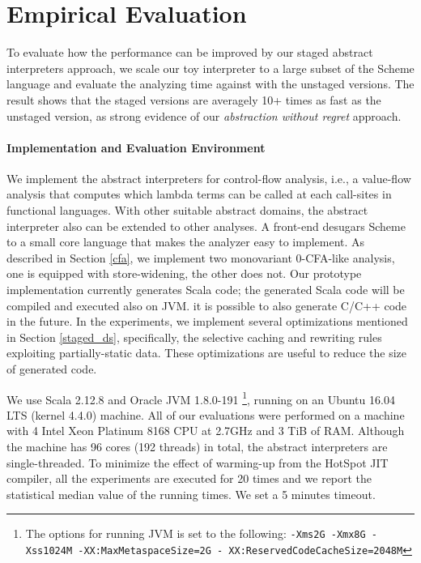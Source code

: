 \section{Empirical Evaluation} \label{evaluation}

To evaluate how the performance can be improved by our staged abstract interpreters
approach, we scale our toy interpreter to a large subset of the Scheme language
and evaluate the analyzing time against with the unstaged versions. The result
shows that the staged versions are averagely 10+ times as fast as the unstaged
version, as strong evidence of our \textit{abstraction without regret}
approach.

\paragraph{Implementation and Evaluation Environment}
We implement the abstract interpreters for control-flow analysis, i.e., a
value-flow analysis that computes which lambda terms can be called at each
call-sites in functional languages. With other suitable abstract domains, the
abstract interpreter also can be extended to other analyses. A front-end
desugars Scheme to a small core language that makes the analyzer easy to
implement. As described in Section \ref{cfa}, we implement two monovariant
0-CFA-like analysis, one is equipped with store-widening, the other does not.
 Our prototype implementation currently generates
Scala code; the generated Scala code will be compiled and executed also on JVM.
it is possible to also generate C/C++ code in the future. In the experiments, we
implement several optimizations mentioned in Section \ref{staged_ds},
specifically, the selective caching and rewriting rules exploiting
partially-static data. These optimizations are useful to reduce the size of
generated code.

We use Scala 2.12.8 and Oracle JVM 1.8.0-191 \footnote{The options for
running JVM is set to the following: \texttt{-Xms2G -Xmx8G -Xss1024M
-XX:MaxMetaspaceSize=2G - XX:ReservedCodeCacheSize=2048M}},
running on an Ubuntu 16.04 LTS (kernel 4.4.0) machine. All of our
evaluations were performed on a machine with 4 Intel Xeon Platinum
8168 CPU at 2.7GHz and 3 TiB of RAM. Although the machine has 96 cores
(192 threads) in total, the abstract interpreters are single-threaded.
To minimize the effect of warming-up from the HotSpot JIT compiler,
all the experiments are executed for 20 times and we report the
statistical median value of the running times. We set a 5 minutes
timeout.

